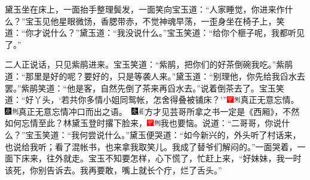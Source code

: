 黛玉坐在床上，一面抬手整理鬓发，一面笑向宝玉道：“人家睡觉，你进来作什么？”宝玉见他星眼微饧，香腮带赤，不觉神魂早荡，一歪身坐在椅子上，笑道：“你才说什么？”黛玉道：“我没说什么。”宝玉笑道：“给你个榧子呢，我都听见了。”

二人正说话，只见紫鹃进来。宝玉笑道：“紫鹃，把你们的好茶倒碗我吃。”紫鹃道：“那里是好的呢？要好的，只是等袭人来。”黛玉道：“别理他，你先给我舀水去罢。”紫鹃笑道：“他是客，自然先倒了茶来再舀水去。”说着倒茶去了。宝玉笑道：“好丫头，‘若共你多情小姐同鸳帐，怎舍得叠被铺床？’”{\includegraphics[width=3mm]{../Images/00002}\includegraphics[width=3mm]{../Images/00011}\footnotesize \kaishu 真正无意忘情。　\includegraphics[width=3mm]{../Images/00004}\includegraphics[width=3mm]{../Images/00011}\footnotesize \kaishu 真正无意忘情冲口而出之语。　\includegraphics[width=3mm]{../Images/00004}\includegraphics[width=3mm]{../Images/00010}\footnotesize \kaishu 方才见芸哥所拿之书一定是《西厢》，不然如何忘情至此？}林黛玉登时撂下脸来，{\includegraphics[width=3mm]{../Images/00002}\includegraphics[width=3mm]{../Images/00011}\footnotesize \kaishu 我也要恼。}说道：“二哥哥，你说什么？”宝玉笑道：“我何尝说什么。”黛玉便哭道：“如今新兴的，外头听了村话来，也说给我听；看了混帐书，也来拿我取笑儿。我成了替爷们解闷的。”一面哭着，一面下床来，往外就走。宝玉不知要怎样，心下慌了，忙赶上来，“好妹妹，我一时该死，你别告诉去。我再要敢，嘴上就长个疔，烂了舌头。”

